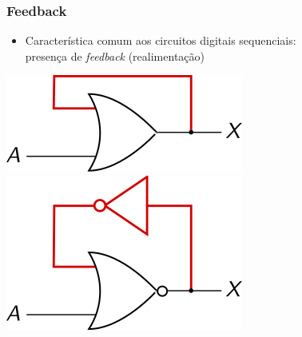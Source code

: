\documentclass{beamer}
\begin{document}
\begin{frame}
\frametitle{Feedback}

\begin{itemize}
\item Característica comum aos circuitos digitais sequenciais:\\
presença de \emph{feedback} (realimentação)
\end{itemize}

\hspace*{\fill}%
\includegraphics{images/circuit1_feed}%
\hspace*{\fill}%
\includegraphics{images/circuit2_feed}%
\hspace*{\fill}
\end{frame}
\end{document}
